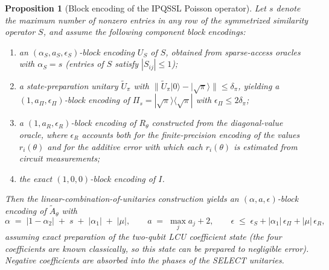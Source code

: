 \documentclass[11pt,a4paper]{article}
\newtheorem{proposition}{Proposition}
\begin{document}
\begin{proposition}[Block encoding of the IPQSSL Poisson operator]
\label{prop:blockencoding}
Let $s$ denote the maximum number of nonzero entries in any row of the
symmetrized similarity operator $S$, and assume the following component
block encodings:
\begin{enumerate}
\item an $(\alpha_S, a_S, \epsilon_S)$-block encoding $U_S$ of $S$,
obtained from sparse-access oracles with $\alpha_S = s$
(entries of $S$ satisfy $|S_{ij}|\le 1$);
\item a state-preparation unitary $\widetilde{U}_\pi$ with
$\|\widetilde{U}_\pi|0\rangle - |\sqrt{\pi}\rangle\| \le \delta_\pi$,
yielding a $(1, a_\Pi, \epsilon_\Pi)$-block encoding of
$\Pi_s = |\sqrt{\pi}\rangle\langle\sqrt{\pi}|$ with
$\epsilon_\Pi \le 2\delta_\pi$;
\item a $(1, a_R, \epsilon_R)$-block encoding of $R_\theta$ constructed
from the diagonal-value oracle, where $\epsilon_R$ accounts both for the
finite-precision encoding of the values $r_i(\theta)$ and for the additive
error with which each $r_i(\theta)$ is estimated from circuit measurements;
\item the exact $(1,0,0)$-block encoding of $I$.
\end{enumerate}
Then the linear-combination-of-unitaries construction yields an
$(\alpha, a, \epsilon)$-block encoding of $\widetilde{A}_\theta$ with
\[
\alpha \;=\; |1-\alpha_2| \;+\; s \;+\; |\alpha_1| \;+\; |\mu|,
\qquad
a \;=\; \max_j a_j + 2,
\qquad
\epsilon \;\le\; \epsilon_S + |\alpha_1|\,\epsilon_\Pi + |\mu|\,\epsilon_R,
\]
assuming exact preparation of the two-qubit LCU coefficient state
(the four coefficients are known classically, so this state can be
prepared to negligible error). Negative coefficients are absorbed into
the phases of the SELECT unitaries.
\end{proposition}
\end{document}

